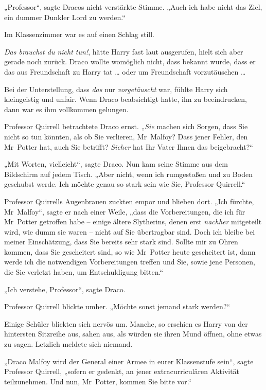 {„Professor“, sagte Dracos nicht verstärkte Stimme. „Auch ich habe nicht das Ziel, ein dummer Dunkler Lord zu werden.“

Im Klassenzimmer war es auf einen Schlag still.

\emph{Das brauchst du nicht tun!}, hätte Harry fast laut ausgerufen, hielt sich aber gerade noch zurück. Draco wollte womöglich nicht, dass bekannt wurde, dass er das aus Freundschaft zu Harry tat … oder um Freundschaft vorzutäuschen …

Bei der Unterstellung, dass \emph{das} nur \emph{vorgetäuscht} war, fühlte Harry sich kleingeistig und unfair. Wenn Draco beabsichtigt hatte, ihn zu beeindrucken, dann war es ihm vollkommen gelungen.

Professor Quirrell betrachtete Draco ernst. „\emph{Sie} machen sich Sorgen, dass Sie nicht so tun könnten, als ob Sie verlieren, Mr~Malfoy? Dass jener Fehler, den Mr~Potter hat, auch Sie betrifft? \emph{Sicher} hat Ihr Vater Ihnen das beigebracht?“

„Mit Worten, vielleicht“, sagte Draco. Nun kam seine Stimme aus dem Bildschirm auf jedem Tisch. „Aber nicht, wenn ich rumgestoßen und zu Boden geschubst werde. Ich möchte genau so stark sein wie Sie, Professor Quirrell.“

Professor Quirrells Augenbrauen zuckten empor und blieben dort. „Ich fürchte, Mr~Malfoy“, sagte er nach einer Weile, „dass die Vorbereitungen, die ich für Mr~Potter getroffen habe -- einige ältere Slytherins, denen erst \emph{nachher} mitgeteilt wird, wie dumm sie waren -- nicht auf Sie übertragbar sind. Doch ich bleibe bei meiner Einschätzung, dass Sie bereits sehr stark sind. Sollte mir zu Ohren kommen, dass Sie gescheitert sind, so wie Mr~Potter heute gescheitert ist, dann werde ich die notwendigen Vorbereitungen treffen und Sie, sowie jene Personen, die Sie verletzt haben, um Entschuldigung bitten.“

„Ich verstehe, Professor“, sagte Draco.

Professor Quirrell blickte umher. „Möchte sonst jemand stark werden?“

Einige Schüler blickten sich nervös um. Manche, so erschien es Harry von der hintersten Sitzreihe aus, sahen aus, als würden sie ihren Mund öffnen, ohne etwas zu sagen. Letzlich meldete sich niemand.

„Draco Malfoy wird der General einer Armee in eurer Klassenstufe sein“, sagte Professor Quirrell, „sofern er gedenkt, an jener extracurriculären Aktivität teilzunehmen. Und nun, Mr~Potter, kommen Sie bitte vor.“

}
